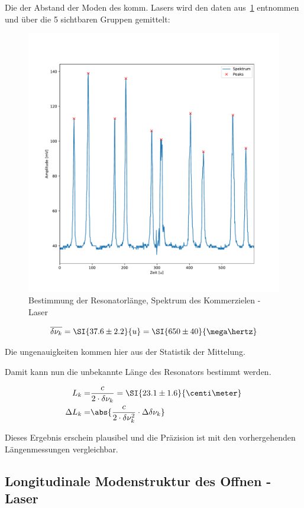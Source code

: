 \documentclass[slug=GL, room=HZDR\ Dresden/Rossendorf\,\ Geb.\ 620/123, supervisor=Tim\ Ziegler]{../../Lab_Report_LaTeX/lab_report}
\newcommand{\hne}{\ce{HeNe}-Laser}
\begin{document}
Die der Abstand der Moden des komm. Lasers wird den daten
aus~\ref{fig:lengthkomm} entnommen und \"uber die 5 sichtbaren Gruppen
gemittelt:
\begin{figure}[b]\centering
  \includegraphics[width=.8\columnwidth]{figs/komm_all_peaks.pdf}
  \caption{Bestimmung der Resonatorl\"ange, Spektrum des Kommerzielen \hne{}}
  \label{fig:lengthkomm}
\end{figure}
\begin{equation}
  \label{eq:modeabstkom}
  \overline{\delta\nu_k}=\SI{37.6\pm 2.2}{u}=\SI{650\pm 40}{\mega\hertz}
\end{equation}

Die ungenauigkeiten kommen hier aus der Statistik der Mittelung.

Damit kann nun die unbekannte L\"ange des Resonators bestimmt werden.

\begin{align}
  L_k =& \frac{c}{2\cdot \delta\nu_k} = \SI{23.1\pm 1.6}{\centi\meter}
  \\
  \Delta L_k =& \abs{\frac{c}{2\cdot\delta\nu_k^2}\cdot \Delta\delta\nu_k}
\end{align}

Dieses Ergebnis erschein plausibel und die Pr\"azision ist mit den
vorhergehenden L\"angenmessungen vergleichbar.

\subsection{Longitudinale Modenstruktur des Offnen \hne{}}
\label{sec:longoff}
\end{document}
